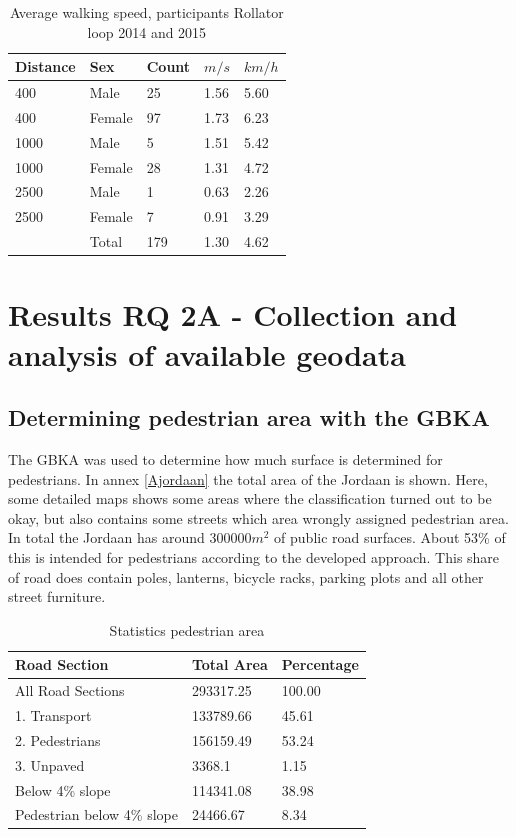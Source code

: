 \begin{table}[h]
\caption{Average walking speed, participants Rollator loop 2014 and 2015 \label{statistiswalkingspeed}}
\centering
\begin{tabular}{|p{70pt}|p{70pt}|p{70pt}|p{70pt}|p{70pt}|}
\hline
Distance & Sex & Count & $m/s$ & $km/h$ \\
\hline
400 & Male	 & 25	& 1.56 & 5.60 \\
400 & Female & 97	& 1.73 & 6.23 \\
\hline
1000 & Male		& 5	 & 1.51	 & 5.42\\
1000 & Female	& 28 & 	1.31 & 4.72\\
\hline
2500 & Male		& 1	 & 0.63	 & 2.26\\
2500 & Female	& 7	 & 0.91	 & 3.29\\
\hline
& Total & 179 & 1.30 & 4.62 \\
\hline
\end{tabular}
\end{table}
\clearpage


\section{Results RQ 2A -  Collection and analysis of available geodata}
\subsection{Determining pedestrian area with the GBKA}
The GBKA was used to determine how much surface is determined for pedestrians. In annex \ref{Ajordaan} the total area of the Jordaan is shown. Here, some detailed maps shows some areas where the classification turned out to be okay, but also contains some streets which area wrongly assigned pedestrian area. In total the Jordaan has around 300000$m^2$ of public road surfaces. About 53\% of this is intended for pedestrians according to the developed approach. This share of road does contain poles, lanterns, bicycle racks, parking plots and all other street furniture. 

\begin{table}[h]
\caption{Statistics pedestrian area \label{statroadsections}}
\centering
\begin{tabular}{|l|l|l|}
\hline
Road Section & Total Area	& Percentage\\
\hline
All Road Sections & 293317.25 & 100.00\\
\hline
1. Transport & 133789.66 & 45.61\\
2. Pedestrians & 156159.49 & 53.24\\
3. Unpaved	& 3368.1 & 1.15\\
\hline
Below 4\% slope & 114341.08 & 38.98\\
Pedestrian below 4\% slope & 24466.67 & 8.34\\
\hline
\end{tabular}
\end{table}

